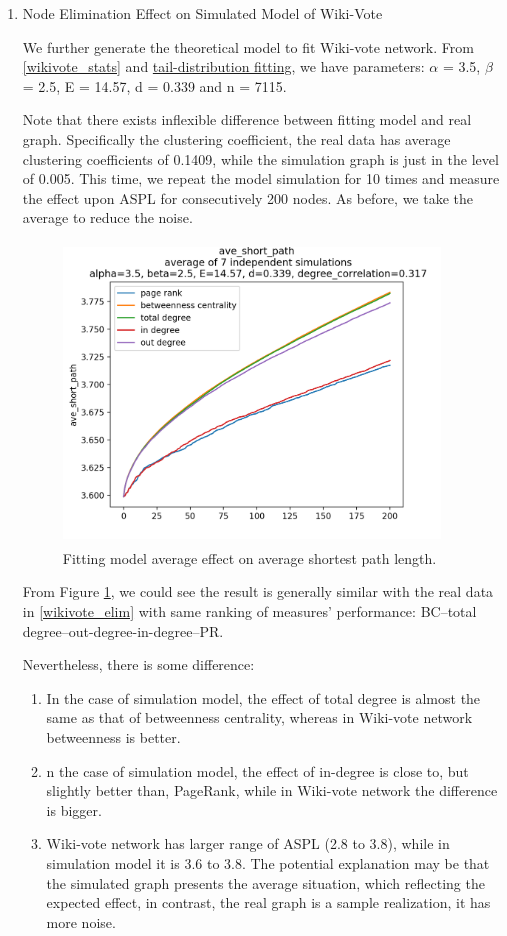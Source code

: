 \documentclass{article}
\begin{document}
\begin{enumerate}
\item Node Elimination Effect on Simulated Model of Wiki-Vote \\

\par We further generate the theoretical model to fit Wiki-vote network. From \ref{wikivote_stats} and \hyperlink{powerlaw_fit}{tail-distribution fitting}, we have parameters:  $\alpha$ = 3.5, $\beta$ = 2.5,  E = 14.57, d = 0.339 and n = 7115. 
\par Note that there exists inflexible difference between fitting model and real graph. Specifically the clustering coefficient, the real data has average clustering coefficients of 0.1409, while the simulation graph is just in the level of 0.005. This time, we repeat the model simulation for 10 times and measure the effect upon ASPL for consecutively 200 nodes. As before, we take the average to reduce the noise. 

\begin{figure}[!htbp]
\label{wikisim}
\centering\includegraphics[width=10cm, height=8cm]{final_images/wikisim.png}
\caption{Fitting model average effect on average shortest path length.}
\end{figure}

From Figure \ref{wikisim},  we could see the result is generally similar with the real data in \ref{wikivote_elim} with same ranking of measures' performance: BC--total degree--out-degree-in-degree--PR.
\par Nevertheless, there is some difference:
\begin{enumerate}
\item  In the case of simulation model, the effect of total degree is almost the same as that of betweenness centrality, whereas in Wiki-vote network betweenness is better.
\item  n the case of simulation model, the effect of in-degree is close to, but slightly better than, PageRank, while in Wiki-vote network the difference is bigger.
\item Wiki-vote network has larger range of ASPL (2.8 to 3.8), while in simulation model it is 3.6 to 3.8. The potential explanation may be that the simulated graph presents the average situation, which reflecting the expected effect, in contrast, the real graph is a sample realization, it has more noise.
\end{enumerate}

\end{enumerate}
\end{document}
